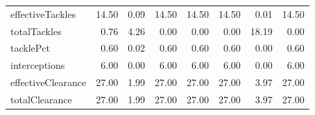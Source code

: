 \begin{table}[H]
\begin{tabular}{lrrrrrrr}
effectiveTackles & 14.50 & 0.09 & 14.50 & 14.50 & 14.50 & 0.01 & 14.50 \\
totalTackles & 0.76 & 4.26 & 0.00 & 0.00 & 0.00 & 18.19 & 0.00 \\
tacklePct & 0.60 & 0.02 & 0.60 & 0.60 & 0.60 & 0.00 & 0.60 \\
interceptions & 6.00 & 0.00 & 6.00 & 6.00 & 6.00 & 0.00 & 6.00 \\
effectiveClearance & 27.00 & 1.99 & 27.00 & 27.00 & 27.00 & 3.97 & 27.00 \\
totalClearance & 27.00 & 1.99 & 27.00 & 27.00 & 27.00 & 3.97 & 27.00 \\
\hline
\end{tabular}
\end{table}
